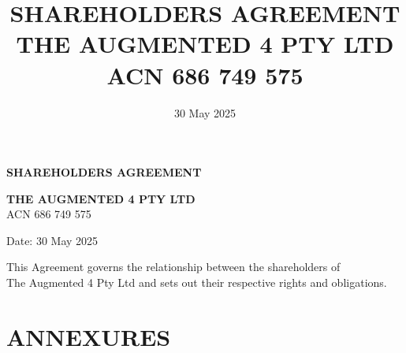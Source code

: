 \documentclass[10pt]{article}
\title{\textbf{SHAREHOLDERS AGREEMENT} \\ \vspace{0.5cm} \large THE AUGMENTED 4 PTY LTD \\ \normalsize ACN 686 749 575}
\author{}
\date{30 May 2025}
\begin{document}
\maketitle

\thispagestyle{empty}

\vspace{2cm}

\begin{center}
\large
\textbf{SHAREHOLDERS AGREEMENT}

\vspace{1cm}

\textbf{THE AUGMENTED 4 PTY LTD}\\
ACN 686 749 575

\vspace{1cm}

Date: 30 May 2025

\vspace{2cm}

\normalsize
This Agreement governs the relationship between the shareholders of\\
The Augmented 4 Pty Ltd and sets out their respective rights and obligations.
\end{center}

\newpage

\tableofcontents

\newpage














\newpage
\appendix





\newpage
\section*{ANNEXURES}

\end{document}
